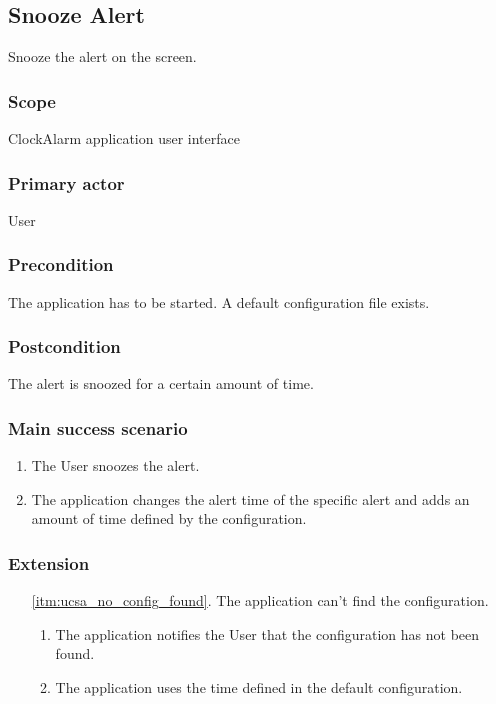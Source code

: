 \subsection{Snooze Alert}\label{subsec:usecase_snooze_alert}
Snooze the alert on the screen.
\subsubsection{Scope}
ClockAlarm application user interface
\subsubsection{Primary actor}
User
\subsubsection{Precondition}
The application has to be started. A default configuration file exists.
\subsubsection{Postcondition}
The alert is snoozed for a certain amount of time.
\subsubsection{Main success scenario}
\begin{enumerate}
    \item The User snoozes the alert.
    \item\label{itm:ucsa_no_config_found} The application changes the alert 
        time of the specific alert and adds an amount of time defined by the
        configuration.
\end{enumerate}
\subsubsection{Extension}
\begin{enumerate}
	\item[\ref{itm:ucsa_no_config_found}.] The application can't find the 
        configuration.
		\begin{enumerate}[i]
			\item The application notifies the User that the configuration
                has not been found.
			\item The application uses the time defined in the default 
                configuration.
		\end{enumerate}
\end{enumerate}
